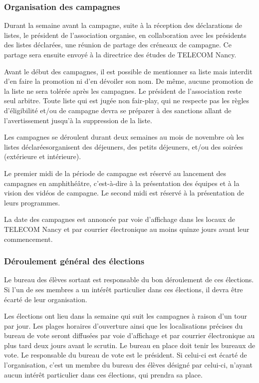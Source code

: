 \documentclass{article} %
\begin{document}
			\subsubsection{Organisation des campagnes}
\label{ssub:organisation_des_campagnes}

				Durant la semaine avant la campagne, suite à la réception des
				déclarations de listes, le président de l’association organise,
				en collaboration avec les présidents des listes déclarées, une
				réunion de partage des créneaux de campagne. Ce partage sera
				ensuite envoyé à la directrice des études de TELECOM Nancy.

				Avant le début des campagnes, il est possible de mentionner sa
				liste mais interdit d’en faire la promotion ni d'en dévoiler son
				nom. De même, aucune promotion de la liste ne sera tolérée après
				les campagnes. Le président de l’association reste seul arbitre.
				Toute liste qui est jugée non fair-play, qui ne respecte pas les
				règles d’éligibilité et/ou de campagne devra se préparer à des
				sanctions allant de l’avertissement jusqu'à la suppression de la
				liste.

				Les campagnes se déroulent durant deux semaines au mois de
				novembre où les listes déclaréesorganisent des déjeuners, des
				petits déjeuners, et/ou des soirées (extérieure et intérieure).
				
				Le premier midi de la période de campagne est réservé au
				lancement des campagnes en amphithéâtre, c’est-à-dire à la
				présentation des équipes et à la vision des vidéos de campagne.
				Le second midi est réservé à la présentation de leurs
				programmes.

				La date des campagnes est annoncée par voie d’affichage dans les
				locaux de TELECOM Nancy et par courrier électronique au moins
				quinze jours avant leur commencement.

			\subsubsection{Déroulement général des élections}
\label{ssub:deroulement_general_des_elections}

				Le bureau des élèves sortant est responsable du bon déroulement
				de ces élections. Si l'un de ses membres a un intérêt
				particulier dans ces élections, il devra être écarté de leur
				organisation.

				Les élections ont lieu dans la semaine qui suit les campagnes à
				raison d’un tour par jour. Les plages horaires d’ouverture ainsi
				que les localisations précises du bureau de vote seront
				diffusées par voie d’affichage et par courrier électronique au
				plus tard deux jours avant le scrutin. Le bureau en place doit
				tenir les bureaux de vote. Le responsable du bureau de vote est
				le président. Si celui-ci est écarté de l’organisation, c'est un
				membre du bureau des élèves désigné par celui-ci, n'ayant aucun
				intérêt particulier dans ces élections, qui prendra sa place.
\end{document}
